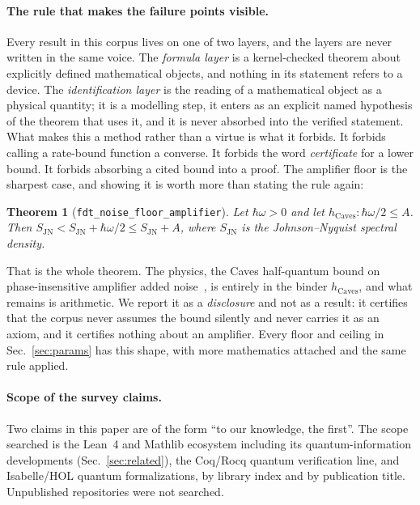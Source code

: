 \documentclass[aps,pra,reprint,nofootinbib,superscriptaddress]{revtex4-2}
\theoremstyle{plain}
\newtheorem{theorem}{Theorem}
\theoremstyle{definition}
\theoremstyle{remark}
\newcommand{\lean}[1]{\texttt{#1}}
\begin{document}
\paragraph*{The rule that makes the failure points visible.} Every result
in this corpus lives on one of two layers, and the layers are never
written in the same voice. The \emph{formula layer} is a kernel-checked
theorem about explicitly defined mathematical objects, and nothing in its
statement refers to a device. The \emph{identification layer} is the
reading of a mathematical object as a physical quantity; it is a
modelling step, it enters as an explicit named hypothesis of the theorem
that uses it, and it is never absorbed into the verified statement. What
makes this a method rather than a virtue is what it forbids. It forbids
calling a rate-bound function a converse. It forbids the word
\emph{certificate} for a lower bound. It forbids absorbing a cited bound
into a proof. The amplifier floor is the sharpest case, and showing it is
worth more than stating the rule again:

\begin{theorem}[\lean{fdt\_noise\_floor\_amplifier}]
\label{thm:caves}
Let $\hbar\omega > 0$ and let
$h_{\mathrm{Caves}} : \hbar\omega/2 \le A$. Then
$S_{\mathrm{JN}} < S_{\mathrm{JN}} + \hbar\omega/2 \le S_{\mathrm{JN}}+A$,
where $S_{\mathrm{JN}}$ is the Johnson--Nyquist spectral density.
\end{theorem}

That is the whole theorem. The physics, the Caves half-quantum bound on
phase-insensitive amplifier added noise~\cite{Caves1982}, is entirely in
the binder $h_{\mathrm{Caves}}$, and what remains is arithmetic. We
report it as a \emph{disclosure} and not as a result: it certifies that
the corpus never assumes the bound silently and never carries it as an
axiom, and it certifies nothing about an amplifier. Every floor and
ceiling in Sec.~\ref{sec:params} has this shape, with more mathematics
attached and the same rule applied.

\paragraph*{Scope of the survey claims.} Two claims in this paper are of
the form ``to our knowledge, the first''. The scope searched is the
Lean~4 and Mathlib ecosystem including its quantum-information
developments (Sec.~\ref{sec:related}), the Coq/Rocq quantum verification
line, and Isabelle/HOL quantum formalizations, by library index and by
publication title. Unpublished repositories were not searched.
\end{document}
